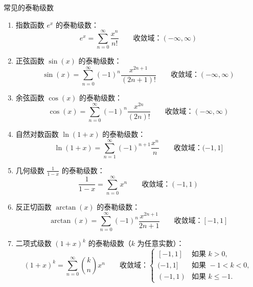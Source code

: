 \begin{defn}
    常见的泰勒级数
    \begin{enumerate}
        \item 指数函数 \( e^x \) 的泰勒级数：
        \[
        e^x = \sum_{n=0}^{\infty} \frac{x^n}{n!} \qquad \text{收敛域：} (-\infty, \infty)
        \]
    
        \item 正弦函数 \( \sin(x) \) 的泰勒级数：
        \[
        \sin(x) = \sum_{n=0}^{\infty} (-1)^n \frac{x^{2n+1}}{(2n+1)!} \qquad \text{收敛域：} (-\infty, \infty)
        \]
    
        \item 余弦函数 \( \cos(x) \) 的泰勒级数：
        \[
        \cos(x) = \sum_{n=0}^{\infty} (-1)^n \frac{x^{2n}}{(2n)!} \qquad \text{收敛域：} (-\infty, \infty)
        \]
    
        \item 自然对数函数 \( \ln(1+x) \) 的泰勒级数：
        \[
        \ln(1+x) = \sum_{n=1}^{\infty} (-1)^{n+1} \frac{x^n}{n} \qquad \text{收敛域：} (-1, 1]
        \]
    
        \item 几何级数 \( \frac{1}{1-x} \) 的泰勒级数：
        \[
        \frac{1}{1-x} = \sum_{n=0}^{\infty} x^n \qquad \text{收敛域：} (-1, 1)
        \]
    
        \item 反正切函数 \( \arctan(x) \) 的泰勒级数：
        \[
        \arctan(x) = \sum_{n=0}^{\infty} (-1)^n \frac{x^{2n+1}}{2n+1} \qquad \text{收敛域：} [-1, 1]
        \]
    
        \item 二项式级数 \( (1+x)^k \) 的泰勒级数（\( k \) 为任意实数）：
        \[
        (1+x)^k = \sum_{n=0}^{\infty} \binom{k}{n} x^n \qquad \text{收敛域：} 
        \begin{cases}
            [-1, 1] & \text{如果 } k > 0, \\
            (-1, 1] & \text{如果 } -1 < k < 0, \\
            (-1, 1) & \text{如果 } k \leq -1.
        \end{cases}
        \]
    \end{enumerate}
\end{defn}
